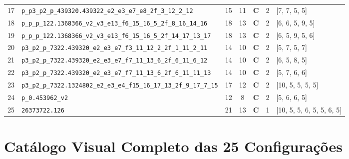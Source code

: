 \documentclass[10pt,a4paper]{article}
\begin{document}
\begin{longtable}{r l c c c c l}
17 & \texttt{p\_p3\_p2\_p\_439320.439322\_e2\_e3\_e7\_e8\_2f\_3\_12\_2\_12} & 15 & 11 & \textbf{C} & 2 & [7, 7, 5, 5] \\
18 & \texttt{p\_p\_p\_122.1368366\_v2\_v3\_e13\_f6\_15\_16\_5\_2f\_8\_16\_14\_16} & 18 & 13 & \textbf{C} & 2 & [6, 6, 5, 9, 5] \\
19 & \texttt{p\_p\_p\_122.1368366\_v2\_v3\_e13\_f6\_15\_16\_5\_2f\_14\_17\_13\_17} & 18 & 13 & \textbf{C} & 2 & [6, 5, 9, 5, 6] \\
20 & \texttt{p3\_p2\_p\_7322.439320\_e2\_e3\_e7\_f3\_11\_12\_2\_2f\_1\_11\_2\_11} & 14 & 10 & \textbf{C} & 2 & [5, 7, 5, 7] \\
21 & \texttt{p3\_p2\_p\_7322.439320\_e2\_e3\_e7\_f7\_11\_13\_6\_2f\_6\_11\_6\_12} & 14 & 10 & \textbf{C} & 2 & [6, 5, 8, 5] \\
22 & \texttt{p3\_p2\_p\_7322.439320\_e2\_e3\_e7\_f7\_11\_13\_6\_2f\_6\_11\_11\_13} & 14 & 10 & \textbf{C} & 2 & [5, 7, 6, 6] \\
23 & \texttt{p3\_p2\_p\_7322.1324802\_e2\_e3\_e4\_f15\_16\_17\_13\_2f\_9\_17\_7\_15} & 17 & 12 & \textbf{C} & 2 & [10, 5, 5, 5, 5] \\
24 & \texttt{p\_0.453962\_v2} & 12 & 8 & \textbf{C} & 2 & [5, 6, 6, 5] \\
25 & \texttt{26373722.126} & 21 & 13 & \textbf{C} & 1 & [10, 5, 5, 6, 5, 5, 6, 5] \\
\end{longtable}

\newpage
\section{Catálogo Visual Completo das 25 Configurações}
\end{document}
